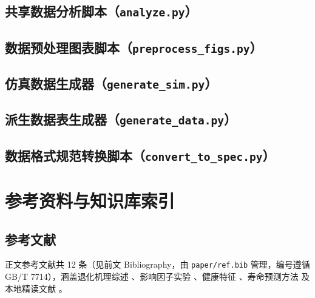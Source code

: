 \documentclass[withoutpreface]{cumcmthesis}
\begin{document}
\begin{appendices}
\subsection{共享数据分析脚本（\texttt{analyze.py}）}


\subsection{数据预处理图表脚本（\texttt{preprocess\_figs.py}）}


\subsection{仿真数据生成器（\texttt{generate\_sim.py}）}


\subsection{派生数据表生成器（\texttt{generate\_data.py}）}


\subsection{数据格式规范转换脚本（\texttt{convert\_to\_spec.py}）}


\section{参考资料与知识库索引}

\subsection{参考文献}
正文参考文献共 12 条（见前文 Bibliography，由 \texttt{paper/ref.bib} 管理，编号遵循 GB/T 7714），涵盖退化机理综述 \cite{Ver22,Mad25}、影响因子实验 \cite{Xu21,Sto19,Str24,For12}、健康特征 \cite{Wil20}、寿命预测方法 \cite{Wu09,Sev19} 及本地精读文献 \cite{L1local,L2local,司守奎2011数学建模算法与应用}。


\end{appendices}
\end{document}
